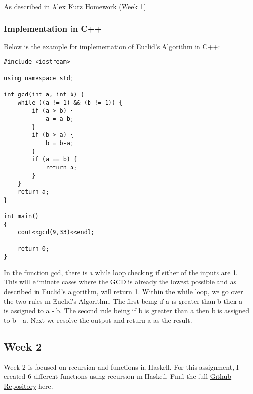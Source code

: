 \documentclass{article}
\theoremstyle{theorem}
\theoremstyle{definition}
\theoremstyle{remark}
\begin{document}
\medskip\noindent
As described in \href{https://hackmd.io/@alexhkurz/SkqMtH0sK}{Alex Kurz Homework (Week 1)}

\subsubsection{Implementation in C++}

Below is the example for implementation of Euclid's Algorithm in C++:
\begin{lstlisting}
#include <iostream>

using namespace std;

int gcd(int a, int b) {
    while ((a != 1) && (b != 1)) {
        if (a > b) {
            a = a-b;
        }
        if (b > a) {
            b = b-a;
        }
        if (a == b) {
            return a;
        }
    }
    return a;
}

int main()
{
    cout<<gcd(9,33)<<endl;

    return 0;
}
\end{lstlisting}
In the function gcd, there is a while loop checking if either of the inputs are 1. This will eliminate cases where the GCD is already the lowest possible and as described in Euclid's algorithm, will return 1. Within the while loop, we go over the two rules in Euclid's Algorithm. The first being if a is greater than b then a is assigned to a - b. The second rule being if b is greater than a then b is assigned to b - a. Next we resolve the output and return a as the result.
\subsection{Week 2}
Week 2 is focused on recursion and functions in Haskell. For this assignment, I created 6 different functions using recursion in Haskell. Find the full \href{https://github.com/dapak2002/Pak-D-CPSC-354-Report/blob/main/src/hw2.hs}{Github Repository} here.
\end{document}
